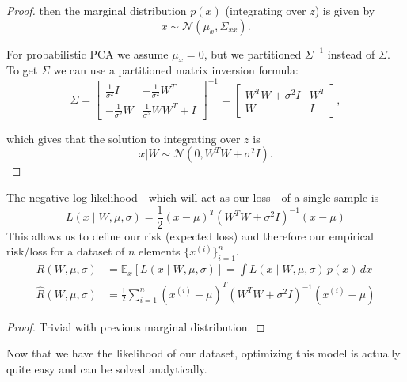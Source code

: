 \begin{proof}
    then the marginal distribution $p(x)$ (integrating over $z$) is given by
    \begin{equation}
      x \sim \mathcal{N}(\mu_x, \Sigma_{xx}).
    \end{equation}

    For probabilistic PCA we assume $\mu_x = 0$, but we partitioned $\Sigma^{-1}$ instead of $\Sigma$. To get $\Sigma$ we can use a partitioned matrix inversion formula:
    \begin{equation}
      \Sigma = \begin{bmatrix} \frac{1}{\sigma^2}I & -\frac{1}{\sigma^2}W^T \\ -\frac{1}{\sigma^2}W & \frac{1}{\sigma^2}WW^T + I \end{bmatrix}^{-1} = \begin{bmatrix} W^TW + \sigma^2 I & W^T \\ W & I \end{bmatrix},
    \end{equation}

    which gives that the solution to integrating over $z$ is
    \begin{equation}
      x | W \sim \mathcal{N}(0, W^T W + \sigma^2 I).
    \end{equation}
  \end{proof}

  \begin{theorem}
    The negative log-likelihood---which will act as our loss---of a single sample is 
    \begin{equation}
      L(x \mid W, \mu, \sigma) = \frac{1}{2} (x - \mu)^T (W^T W + \sigma^2 I)^{-1} (x - \mu)
    \end{equation} 
    This allows us to define our risk (expected loss) and therefore our empirical risk/loss for a dataset of $n$ elements $\{x^{(i)}\}_{i=1}^n$. 
    \begin{align}
      R(W, \mu, \sigma) & = \mathbb{E}_x [ L(x \mid W, \mu, \sigma)] = \int L(x \mid W, \mu, \sigma) \, p(x) \,dx \\ 
      \hat{R}(W, \mu, \sigma) & = \frac{1}{2} \sum_{i=1}^n (x^{(i)} - \mu)^T (W^T W + \sigma^2 I)^{-1} (x^{(i)} - \mu)
    \end{align}
  \end{theorem}
  \begin{proof}
    Trivial with previous marginal distribution. 
  \end{proof}

  Now that we have the likelihood of our dataset, optimizing this model is actually quite easy and can be solved analytically. 

